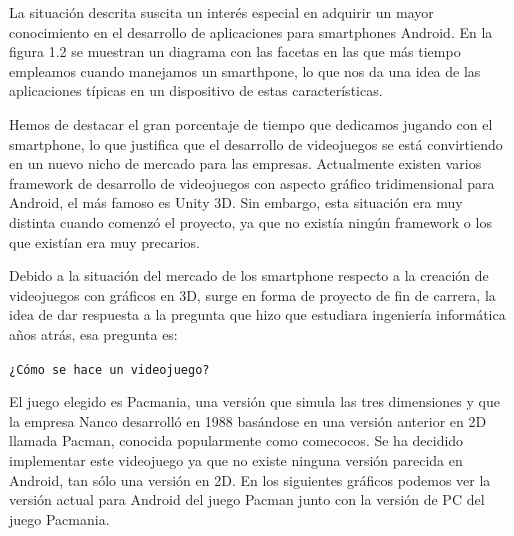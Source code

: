 La situación descrita suscita un interés especial en adquirir un mayor conocimiento en el desarrollo de aplicaciones para smartphones Android. En la figura 1.2 se muestran un diagrama con las facetas en las que más tiempo empleamos cuando manejamos un smarthpone, lo que nos da una idea de las aplicaciones típicas en un dispositivo de estas características. 
\newline

Hemos de destacar el gran porcentaje de tiempo que dedicamos jugando con el smartphone, lo que justifica que el desarrollo de videojuegos se está convirtiendo en un nuevo nicho de mercado para las empresas. Actualmente existen varios framework de desarrollo de videojuegos con aspecto gráfico tridimensional para Android, el más famoso es Unity 3D. Sin embargo, esta situación era muy distinta cuando comenzó el proyecto, ya que no existía ningún framework o los que existían era muy precarios.
\newline 

Debido a la situación del mercado de los smartphone respecto a la creación de videojuegos con gráficos en 3D, surge en forma de proyecto de fin de carrera, la idea de dar respuesta a la pregunta que hizo que estudiara ingeniería informática años atrás, esa pregunta es:
\begin{center}
\texttt{¿Cómo se hace un videojuego?}
\end{center}

El juego elegido es Pacmania, una versión que simula las tres dimensiones y que la empresa Nanco desarrolló en 1988 basándose en una versión anterior en 2D llamada Pacman, conocida popularmente como comecocos. Se ha decidido implementar este videojuego ya que no existe ninguna versión parecida en Android, tan sólo una versión en 2D. En los siguientes gráficos podemos ver la versión actual para Android del juego Pacman junto con la versión de PC del juego Pacmania.


